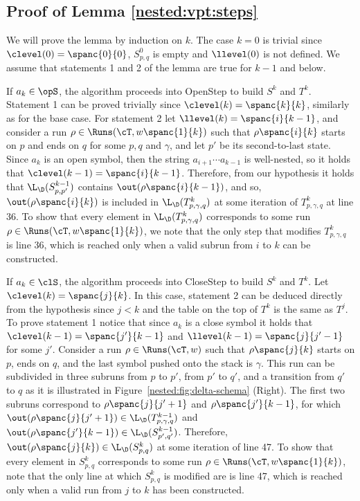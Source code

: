 
\subsection{Proof of Lemma \ref{nested:vpt:steps}}

	We will prove the lemma by induction on $k$. 
	The case $k = 0$ is trivial since $\clevel(0) = \spanc{0}{0}$, $S^0_{p,q}$ is empty and $\llevel(0)$ is not defined. 
	We assume that statements 1 and 2 of the lemma are true for $k-1$ and below. 
	
	If $a_k\in\opS$, the algorithm proceeds into {\sc OpenStep} to build $S^k$ and $T^k$. 
	Statement 1 can be proved trivially since $\clevel(k) = \spanc{k}{k}$, similarly as for the base case.
	For statement 2 let $\llevel(k) = \spanc{i}{k-1}$, and consider a run $\rho\in\Runs(\cT,w\spanc{1}{k})$ such that $\rho\spanc{i}{k}$ starts on $p$ and ends on $q$ for some $p,q$ and $\gamma$, and let $p'$ be its second-to-last state. 
	Since $a_k$ is an open symbol, then the string $a_{i+1}\cdots a_{k-1}$ is well-nested, so it holds that $\clevel(k-1) = \spanc{i}{k-1}$. 
	Therefore, from our hypothesis it holds that $\L_{\D}(S^{k-1}_{p,p'})$ contains $\out(\rho\spanc{i}{k-1})$, and so, $\out(\rho\spanc{i}{k})$ is included in $\L_{\D}(T^{k}_{p,\gamma,q})$ at some iteration of $T^{k}_{p,\gamma,q}$ at line 36. 
	To show that every element in $\L_{\D}(T^k_{p,\gamma,q})$ corresponds to some run $\rho\in\Runs(\cT,w\spanc{1}{k})$, we note that the only step that modifies $T^k_{p,\gamma,q}$ is line 36, which is reached only when a valid subrun from $i$ to $k$ can be constructed.
	
	If $a_k\in\clS$, the algorithm proceeds into {\sc CloseStep} to build $S^k$ and $T^k$. 
	Let $\clevel(k) = \spanc{j}{k}$.
	In this case, statement 2 can be deduced directly from the hypothesis since $j < k$ and the table on the top of $T^k$ is the same as $T^{j}$.
	To prove statement 1 notice that since $a_k$ is a close symbol it holds that $\clevel(k-1) = \spanc{j'}{k-1}$ and $\llevel(k-1) = \spanc{j}{j'-1}$ for some $j'$. 
	Consider a run $\rho\in\Runs(\cT,w)$ such that $\rho\spanc{j}{k}$ starts on $p$, ends on $q$, and the last symbol pushed onto the stack is $\gamma$.
	This run can be subdivided in three subruns from $p$ to $p'$, from $p'$ to $q'$, and a transition from $q'$ to $q$ as it is illustrated in Figure~\ref{nested:fig:delta-schema} (Right). 
	The first  two subruns correspond to $\rho\spanc{j}{j'+1}$ and $\rho\spanc{j'}{k-1}$, for which $\out(\rho\spanc{j}{j'+1})\in\L_{\D}(T^{k-1}_{p,\gamma,q})$ and $\out(\rho\spanc{j'}{k-1})\in\L_{\D}(S^{k-1}_{p',q'})$.
	Therefore, $\out(\rho\spanc{j}{k}) \in \L_{\D}(S^k_{p,q})$ at some iteration of line 47.
	To show that every element in $S^k_{p,q}$ corresponds to some run $\rho\in\Runs(\cT, w\spanc{1}{k})$, note that the only line at which $S^k_{p,q}$ is modified are is line 47, which is reached only when a valid run from $j$ to $k$ has been constructed.
	
